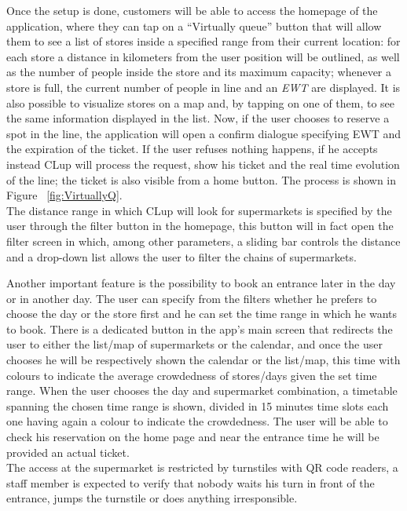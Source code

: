 Once the setup is done, customers will be able to access the homepage of the application, where they can tap on a “Virtually queue” button that will allow them to see a list of stores inside a specified range from their current location: for each store a distance in kilometers from the user position will be outlined, as well as the number of people inside the store and its maximum capacity; whenever a store is full, the current number of people in line and an \textit{EWT} are displayed.\newline  
It is also possible to visualize stores on a map and, by tapping on one of them, to see the same information displayed in the list. Now, if the user chooses to reserve a spot in the line, the application will open a confirm dialogue specifying EWT and the expiration of the ticket. If the user refuses nothing happens, if he accepts instead CLup will process the request, show his ticket and the real time evolution of the line; the ticket is also visible from a home button. The process is shown in Figure ~\ref{fig:VirtuallyQ}.\\
The distance range in which CLup will look for supermarkets is specified by the user through the filter button in the homepage, this button will in fact open the filter screen in which, among other parameters, a sliding bar controls the distance and a drop-down list allows the user to filter the chains of supermarkets.\newline

Another important feature is the possibility to book an entrance later in the day or in another day. The user can specify from the filters whether he prefers to choose the day or the store first and he can set the time range in which he wants to book. 
There is a dedicated button in the app’s main screen that redirects the user to either the list/map of supermarkets or the calendar, and once the user chooses he will be respectively shown the calendar or the list/map, this time with colours to indicate the average crowdedness of stores/days given the set time range.
When the user chooses the day and supermarket combination, a timetable spanning the chosen time range is shown, divided in 15 minutes time slots each one having again a colour to indicate the crowdedness. The user will be able to check his reservation on the home page and near the entrance time he will be provided an actual ticket.\\
The access at the supermarket is restricted by turnstiles with QR code readers, a staff member is expected to verify that nobody waits his turn in front of the entrance, jumps the turnstile or does anything irresponsible.

